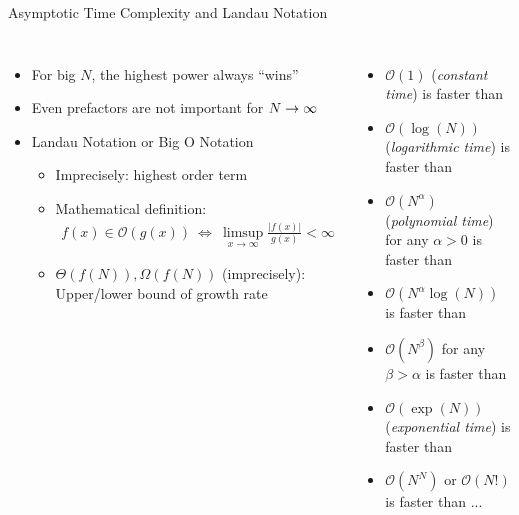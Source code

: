 \begin{frame}{Asymptotic Time Complexity and Landau Notation}
%
\begin{columns}[T]
\begin{itemize}
\item For big $N$, the highest power always \enquote{wins}
\item Even prefactors are not important for $N \rightarrow \infty$
\item Landau Notation or Big O Notation
	\begin{itemize}
	\item Imprecisely: highest order term
	\item Mathematical definition:
	\begin{align*}
		f(x) \in \mathcal{O}(g(x))
		~
		\Leftrightarrow
		~
		\limsup_{x \to \infty} 
			\frac
			{|f(x)|}
			{g(x)}
		< \infty
	\end{align*}
	\item $\Theta(f(N)), \Omega(f(N))$ (imprecisely): Upper/lower bound of growth rate
	\end{itemize}
\end{itemize}
%
\begin{itemize}
\item $\mathcal{O}(1)$ (\emph{constant time}) is faster than
\item $\mathcal{O}(\log(N))$ (\emph{logarithmic time}) is faster than
\item $\mathcal{O}(N^{\alpha})$ (\emph{polynomial time}) for any $\alpha > 0$ is faster than
\item $\mathcal{O}(N^{\alpha} \log(N))$ is faster than
\item $\mathcal{O}(N^{\beta})$ for any $\beta > \alpha$ is faster than
\item $\mathcal{O}(\exp(N))$ (\emph{exponential time}) is faster than
\item $\mathcal{O}(N^N)$ or $\mathcal{O}(N!)$ is faster than ...
\end{itemize}
\end{columns}
%
\end{frame}


